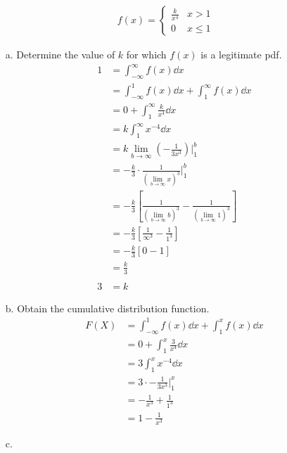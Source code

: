 \documentclass[letterpaper,12pt]{article}
\begin{document}
\begin{enumerate}
    \begin{align*}
      f(x) = \begin{cases}
        \frac{k}{x^4} & x > 1 \\
        0             & x \le 1
      \end{cases}
    \end{align*}
    \begin{enumerate}
      \item[a.]
        Determine the value of $k$ for which $f(x)$ is a legitimate pdf.
        \begin{align*}
          1 &= \int_{-\infty}^{\infty} f(x) \dd{x} \\
          &= \int_{-\infty}^{1} f(x) \dd{x} + \int_{1}^{\infty} f(x) \dd{x} \\
          &= 0 + \int_{1}^{\infty} \frac{k}{x^4} \dd{x} \\
          &= k \int_{1}^{\infty} x^{-4} \dd{x} \\
          &= k \lim_{b \to \infty} \left(-\frac{1}{3x^3}\right) \bigg\rvert_{1}^{b} \\
          &= -\frac{k}{3} \cdot \frac{1}{(\lim_{b \to \infty} x)^3} \bigg\rvert_{1}^{b} \\
          &= -\frac{k}{3} \left[\frac{1}{(\lim_{b \to \infty} b)^3} - \frac{1}{(\lim_{b \to \infty} 1)^3}\right] \\
          &= -\frac{k}{3} \left[\frac{1}{\infty^3} - \frac{1}{1^3}\right] \\
          &= -\frac{k}{3} [0 - 1] \\
          &= \frac{k}{3} \\
          \\
          3 &= k
        \end{align*}
      \item[b.]
        Obtain the cumulative distribution function.
        \begin{align*}
          F(X) &= \int_{-\infty}^{1} f(x) \dd{x} + \int_{1}^{x} f(x) \dd{x} \\
          &= 0 + \int_{1}^{x} \frac{3}{x^4} \dd{x} \\
          &= 3 \int_{1}^{x} x^{-4} \dd{x} \\
          &= 3 \cdot -\frac{1}{3x^3} \bigg\rvert_{1}^{x} \\
          &= -\frac{1}{x^3} + \frac{1}{1^3} \\
          &= 1 - \frac{1}{x^3}
        \end{align*}
      \item[c.]

\end{enumerate}
\end{enumerate}
\end{document}
